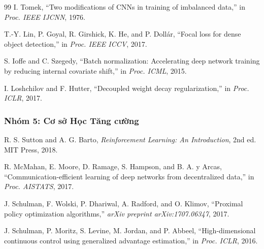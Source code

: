 \documentclass[12pt,a4paper]{article}
\begin{document}
\begin{thebibliography}{99}
  I. Tomek, ``Two modifications of CNNs in training of imbalanced data,'' in \textit{Proc. IEEE IJCNN}, 1976.

  T.-Y. Lin, P. Goyal, R. Girshick, K. He, and P. Dollár, ``Focal loss for dense object detection,'' in \textit{Proc. IEEE ICCV}, 2017.

  S. Ioffe and C. Szegedy, ``Batch normalization: Accelerating deep network training by reducing internal covariate shift,'' in \textit{Proc. ICML}, 2015.

  I. Loshchilov and F. Hutter, ``Decoupled weight decay regularization,'' in \textit{Proc. ICLR}, 2017.

\subsubsection*{Nhóm 5: Cơ sở Học Tăng cường}

  R. S. Sutton and A. G. Barto, \textit{Reinforcement Learning: An Introduction}, 2nd ed. MIT Press, 2018.

  R. McMahan, E. Moore, D. Ramage, S. Hampson, and B. A. y Arcas, ``Communication-efficient learning of deep networks from decentralized data,'' in \textit{Proc. AISTATS}, 2017.

  J. Schulman, F. Wolski, P. Dhariwal, A. Radford, and O. Klimov, ``Proximal policy optimization algorithms,'' \textit{arXiv preprint arXiv:1707.06347}, 2017.

  J. Schulman, P. Moritz, S. Levine, M. Jordan, and P. Abbeel, ``High-dimensional continuous control using generalized advantage estimation,'' in \textit{Proc. ICLR}, 2016.

\end{thebibliography}
\end{document}
